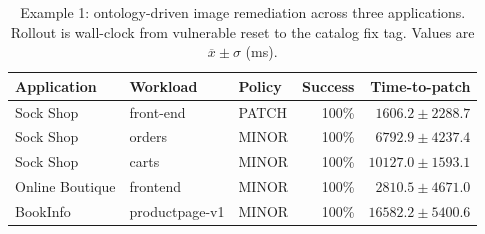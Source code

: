 \begin{table}[htbp]
\centering
\caption{Example 1: ontology-driven image remediation across three applications. Rollout is wall-clock from vulnerable reset to the catalog fix tag. Values are $\overline{x} \pm \sigma$ (ms).}
\label{tab:paper_e1_remediation}
\footnotesize
\begin{tabular}{lllrr}
\toprule
\textbf{Application} & \textbf{Workload} & \textbf{Policy} & \textbf{Success} & \textbf{Time-to-patch} \\
\midrule
Sock Shop & front-end & PATCH & 100\% & $1606.2 \pm 2288.7$ \\
Sock Shop & orders & MINOR & 100\% & $6792.9 \pm 4237.4$ \\
Sock Shop & carts & MINOR & 100\% & $10127.0 \pm 1593.1$ \\
Online Boutique & frontend & MINOR & 100\% & $2810.5 \pm 4671.0$ \\
BookInfo & productpage-v1 & MINOR & 100\% & $16582.2 \pm 5400.6$ \\
\bottomrule
\end{tabular}
\end{table}
